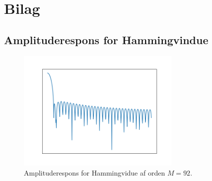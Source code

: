 \chapter{Bilag}\label{app2}
\section{Amplituderespons for Hammingvindue}
\begin{figure}
\centering
\includegraphics[width=0.7\textwidth]{figures/amplituderespons.png}
\caption{Amplituderespons for Hammingvidue af orden $M=92$.}
\label{fig:amplituderespons}
\end{figure}